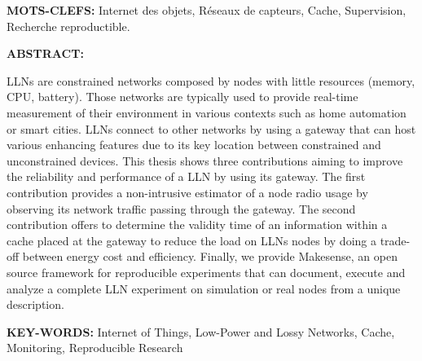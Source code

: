\textbf{MOTS-CLEFS:} Internet des objets, Réseaux de capteurs, Cache, Supervision, Recherche reproductible.

\vspace{1.0cm}

\textbf{ABSTRACT:}

\acf{LLN}s are constrained networks composed by nodes with little resources (memory, CPU, battery).
Those networks are typically used to provide real-time measurement of their environment in various contexts such as home automation or smart cities.
\ac{LLN}s connect to other networks by using a gateway that can host various enhancing features due to its key location between constrained and unconstrained devices.
This thesis shows three contributions aiming to improve the reliability and performance of a \ac{LLN} by using its gateway.
The first contribution provides a non-intrusive estimator of a node radio usage by observing its network traffic passing through the gateway.
The second contribution offers to determine the validity time of an information within a cache placed at the gateway to reduce the load on \ac{LLN}s nodes by doing a trade-off between energy cost and efficiency.
Finally, we provide Makesense, an open source framework for reproducible experiments that can document, execute and analyze a complete \ac{LLN} experiment on simulation or real nodes from a unique description.

\vspace{.6cm}
\textbf{KEY-WORDS:} Internet of Things, Low-Power and Lossy Networks, Cache, Monitoring, Reproducible Research

\restoregeometry
